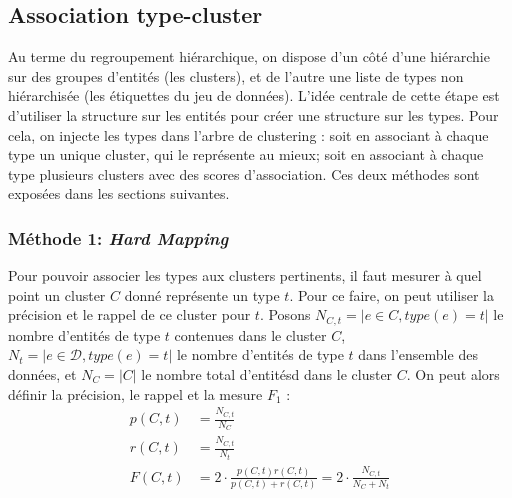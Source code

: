 

\subsection{Association type-cluster}
\label{subsec:te-mapping}


Au terme du regroupement hiérarchique, on dispose d'un côté d'une hiérarchie sur des groupes d'entités (les clusters), et de l'autre une liste de types non hiérarchisée (les étiquettes du jeu de données). L'idée centrale de cette étape est d'utiliser la structure sur les entités pour créer une structure sur les types. Pour cela, on injecte les types dans l'arbre de clustering : soit en associant à chaque type un unique cluster, qui le représente au mieux; soit en associant à chaque type plusieurs clusters avec des scores d'association. Ces deux méthodes sont exposées dans les sections suivantes.




\subsubsection{Méthode 1: \textit{Hard Mapping}}
\label{ssubsec:te-hardmapping}

Pour pouvoir associer les types aux clusters pertinents, il faut mesurer à quel point un cluster $C$ donné représente un type $t$. Pour ce faire, on peut utiliser la précision et le rappel de ce cluster pour $t$. Posons $N_{C,t} = | e \in C, type(e) = t|$ le nombre d'entités de type $t$ contenues dans le cluster $C$,
$N_t = |e \in \mathcal{D}, type(e) = t|$ le nombre d'entités de type $t$ dans l'ensemble des données, et $N_C = | C |$ le nombre total d'entitésd dans le cluster $C$. On peut alors définir la précision, le rappel et la mesure $F_1$ :
\begin{align}
    p(C, t) &= \frac{N_{C, t}}{N_C} \\
    r(C, t) &= \frac{N_{C, t}}{N_t} \\
    F(C, t) &= 2 \cdot \frac{p(C, t)r(C, t)}{p(C, t) + r(C, t)} = 2 \cdot \frac{N_{C,t}}{N_C + N_t}
\end{align}

